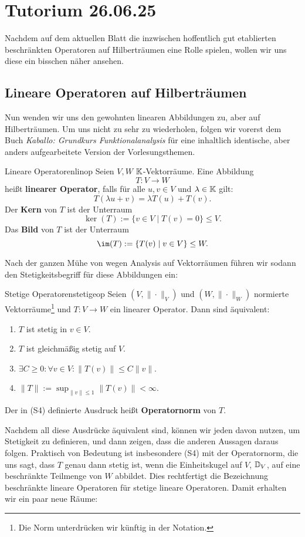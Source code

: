 \section{Tutorium 26.06.25}
\label{tutorium26_06_25}

Nachdem auf dem aktuellen Blatt die inzwischen hoffentlich gut etablierten beschränkten Operatoren auf Hilberträumen eine Rolle spielen, wollen wir uns diese ein bisschen näher ansehen.

\subsection{Lineare Operatoren auf Hilberträumen}

Nun wenden wir uns den gewohnten linearen Abbildungen zu, aber auf Hilberträumen. Um uns nicht zu sehr zu wiederholen, folgen wir vorerst dem Buch \textit{Kaballo: Grundkurs Funktionalanalysis} für eine inhaltlich identische, aber anders aufgearbeitete Version der Vorlesungsthemen.
\begin{definition}{Lineare Operatoren}{linop}
Seien $V,W$ $\mathbb{K}$-Vektorräume. Eine Abbildung
\[
T: V \to W
\]
heißt \textbf{linearer Operator}, falls für alle $u,v \in V$ und $\lambda \in \mathbb{K}$ gilt:
\[
T(\lambda u + v)= \lambda T(u)+T(v).
\]
Der \textbf{Kern} von $T$ ist der Unterraum
\[
\ker(T):= \{v \in V \mid T(v)=0\} \leq V.
\]
Das \textbf{Bild} von $T$ ist der Unterraum
\[
\im(T):= \{T(v) \mid v \in V\} \leq W.
\]
\end{definition}
Nach der ganzen Mühe von wegen Analysis auf Vektorräumen führen wir sodann den Stetigkeitsbegriff für diese Abbildungen ein:
\begin{definition}{Stetige Operatoren}{stetigeop}
Seien $(V,\|\cdot\|_V)$ und $(W,\|\cdot\|_W)$ normierte Vektorräume\footnote{Die Norm unterdrücken wir künftig in der Notation.} und $T: V \to W$ ein linearer Operator. Dann sind äquivalent:
\begin{enumerate}[({S}1)]
	\item $T$ ist stetig in $v \in V$.
	\item $T$ ist gleichmäßig stetig auf $V$.
	\item $\exists C \geq 0: \forall v \in V: \|T(v)\| \leq C \|v\|$.
	\item $\|T\| := \sup_{\|v\| \leq 1} \| T(v) \| < \infty.$
\end{enumerate}
Der in (S4) definierte Ausdruck heißt \textbf{Operatornorm} von $T$.
\end{definition}
Nachdem all diese Ausdrücke äquivalent sind, können wir jeden davon nutzen, um Stetigkeit zu definieren, und dann zeigen, dass die anderen Aussagen daraus folgen. Praktisch von Bedeutung ist insbesondere (S4) mit der Operatornorm, die uns sagt, dass $T$ genau dann stetig ist, wenn die Einheitskugel auf $V$, $\mathbb{D}_V$, auf eine beschränkte Teilmenge von $W$ abbildet. Dies rechtfertigt die Bezeichnung beschränkte lineare Operatoren für stetige lineare Operatoren. Damit erhalten wir ein paar neue Räume:
